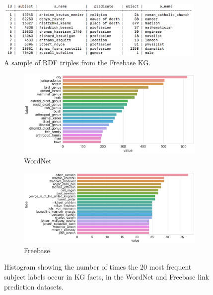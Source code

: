 \begin{figure}
   	\centering
    	\includegraphics[width=0.9\textwidth, height=0.2\textwidth]{freebase_fact_sample}
	\captionsetup{justification=centering}
	\caption{A sample of RDF triples from the Freebase KG.}
\end{figure}



\begin{figure}
	\begin{subfigure}[b]{.5\linewidth}
   		\centering
    		\includegraphics[width=1.0\linewidth, height=0.6\linewidth]{Wordnet_Subject_Counts}
		\captionsetup{justification=centering}
		\caption{WordNet}
	\end{subfigure}
	\begin{subfigure}[b]{.5\linewidth}
   		\centering
		\includegraphics[width=1.0\linewidth, height=0.6\linewidth]{Freebase_Subject_Counts}
		\captionsetup{justification=centering}
		\caption{Freebase}
	\end{subfigure}
	\captionsetup{justification=centering}
	\caption{Histogram showing the number of times the 20 most frequent subject labels occur in KG facts, in the WordNet and Freebase link prediction datasets.}
\end{figure}


